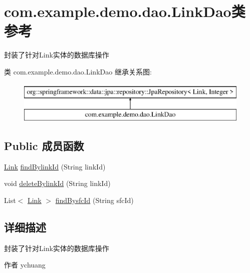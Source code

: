 \hypertarget{interfacecom_1_1example_1_1demo_1_1dao_1_1_link_dao}{}\section{com.\+example.\+demo.\+dao.\+Link\+Dao类 参考}
\label{interfacecom_1_1example_1_1demo_1_1dao_1_1_link_dao}


封装了针对\+Link实体的数据库操作  


类 com.\+example.\+demo.\+dao.\+Link\+Dao 继承关系图\+:\begin{figure}[H]
\begin{center}
\leavevmode
\includegraphics[height=2.000000cm]{interfacecom_1_1example_1_1demo_1_1dao_1_1_link_dao}
\end{center}
\end{figure}
\subsection*{Public 成员函数}
\begin{DoxyCompactItemize}
\item 
\mbox{\hyperlink{classcom_1_1example_1_1demo_1_1modular_1_1_link}{Link}} \mbox{\hyperlink{interfacecom_1_1example_1_1demo_1_1dao_1_1_link_dao_a4d412f35f199230b25a74154edf0cc18}{find\+Bylink\+Id}} (String link\+Id)
\item 
void \mbox{\hyperlink{interfacecom_1_1example_1_1demo_1_1dao_1_1_link_dao_a5c188fbc85f9d2079431035adf2f58c0}{delete\+Bylink\+Id}} (String link\+Id)
\item 
List$<$ \mbox{\hyperlink{classcom_1_1example_1_1demo_1_1modular_1_1_link}{Link}} $>$ \mbox{\hyperlink{interfacecom_1_1example_1_1demo_1_1dao_1_1_link_dao_a128ff4d962f78f8adccfc3063c495533}{find\+Bysfc\+Id}} (String sfc\+Id)
\end{DoxyCompactItemize}


\subsection{详细描述}
封装了针对\+Link实体的数据库操作 

\begin{DoxyAuthor}{作者}
ychuang 
\end{DoxyAuthor}



